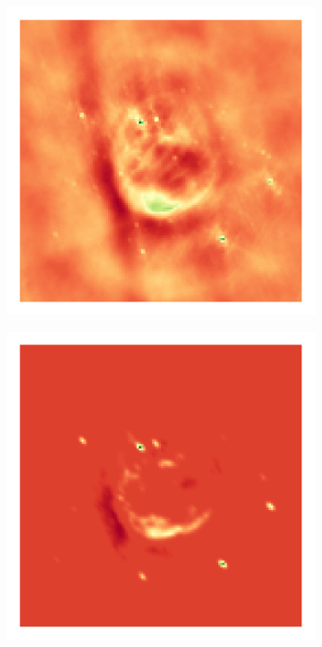 \begin{figure}[h]
	\centering
	\begin{subfigure}[b]{0.24\linewidth}
		\includegraphics[width=\linewidth, trim={18px 19px 18px 18px}, clip]{./chapters/05.results/g55/raw_model.png}
	\end{subfigure}
	\begin{subfigure}[b]{0.24\linewidth}
		\includegraphics[width=\linewidth, trim={18px 19px 18px 18px}, clip]{./chapters/05.results/g55/clean_model.png}

\end{subfigure}
\end{figure}
